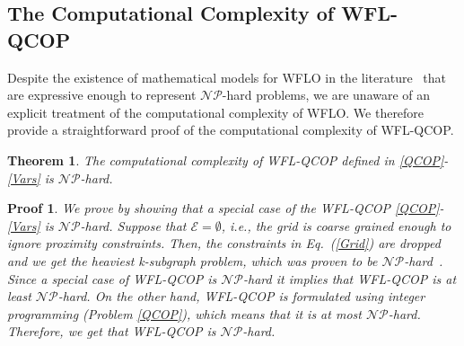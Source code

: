 \documentclass[preprint,12pt]{elsarticle}
\newtheorem{mythm}{Theorem}
\newtheorem{myproof}{Proof}
\newcommand{\todo}[1]{{\textcolor{red}{\bf {#1}}}}
\begin{document}
\subsection{The Computational Complexity of WFL-QCOP}
\label{sec:computational}
Despite the existence of mathematical models for WFLO in the literature~\cite{Zhang2014,donovan2005wind} that are expressive enough to represent $\mathcal{NP}$-hard problems, we are unaware of an explicit treatment of the computational complexity of WFLO.
We therefore provide a straightforward proof of the computational complexity of WFL-QCOP. 

\begin{mythm}
	The computational complexity of WFL-QCOP defined in \eqref{QCOP}-\eqref{Vars} is $\mathcal{NP}$-hard. 
\end{mythm}
\begin{myproof}
We prove by showing that a special case of the WFL-QCOP \eqref{QCOP}-\eqref{Vars}  is
$\mathcal{NP}$-hard. Suppose that $\mathcal{E} = \emptyset$, i.e., the grid is coarse grained enough to ignore proximity constraints. Then, the constraints in Eq.~(\ref{Grid})
are dropped and we get the heaviest k-subgraph problem, which was proven to be $\mathcal{NP}$-hard~\cite{billionnet2005different}.
Since a special case of WFL-QCOP is  $\mathcal{NP}$-hard it implies that WFL-QCOP is at least $\mathcal{NP}$-hard. On the other hand,
WFL-QCOP is formulated using integer programming (Problem \ref{QCOP}), which means that it is at most $\mathcal{NP}$-hard. Therefore, we get that WFL-QCOP is $\mathcal{NP}$-hard.
\end{myproof}


\end{document}
